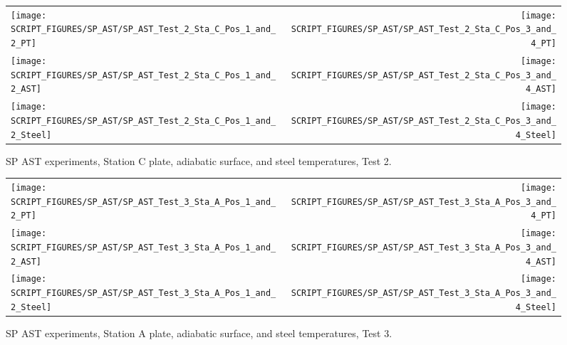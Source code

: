 \begin{figure}[p]
\begin{tabular*}{\textwidth}{l@{\extracolsep{\fill}}r}
\texttt{[image: SCRIPT\_FIGURES/SP\_AST/SP\_AST\_Test\_2\_Sta\_C\_Pos\_1\_and\_2\_PT]} &
\texttt{[image: SCRIPT\_FIGURES/SP\_AST/SP\_AST\_Test\_2\_Sta\_C\_Pos\_3\_and\_4\_PT]} \\
\texttt{[image: SCRIPT\_FIGURES/SP\_AST/SP\_AST\_Test\_2\_Sta\_C\_Pos\_1\_and\_2\_AST]} &
\texttt{[image: SCRIPT\_FIGURES/SP\_AST/SP\_AST\_Test\_2\_Sta\_C\_Pos\_3\_and\_4\_AST]} \\
\texttt{[image: SCRIPT\_FIGURES/SP\_AST/SP\_AST\_Test\_2\_Sta\_C\_Pos\_1\_and\_2\_Steel]} &
\texttt{[image: SCRIPT\_FIGURES/SP\_AST/SP\_AST\_Test\_2\_Sta\_C\_Pos\_3\_and\_4\_Steel]}
\end{tabular*}
\caption[SP AST experiments, Station C plate, adiabatic surface, and steel temperatures, Test 2]{SP AST experiments, Station C plate, adiabatic surface, and steel temperatures, Test 2.}
\label{SP_Test_2_Station_C}
\end{figure}


\begin{figure}[p]
\begin{tabular*}{\textwidth}{l@{\extracolsep{\fill}}r}
\texttt{[image: SCRIPT\_FIGURES/SP\_AST/SP\_AST\_Test\_3\_Sta\_A\_Pos\_1\_and\_2\_PT]} &
\texttt{[image: SCRIPT\_FIGURES/SP\_AST/SP\_AST\_Test\_3\_Sta\_A\_Pos\_3\_and\_4\_PT]} \\
\texttt{[image: SCRIPT\_FIGURES/SP\_AST/SP\_AST\_Test\_3\_Sta\_A\_Pos\_1\_and\_2\_AST]} &
\texttt{[image: SCRIPT\_FIGURES/SP\_AST/SP\_AST\_Test\_3\_Sta\_A\_Pos\_3\_and\_4\_AST]} \\
\texttt{[image: SCRIPT\_FIGURES/SP\_AST/SP\_AST\_Test\_3\_Sta\_A\_Pos\_1\_and\_2\_Steel]} &
\texttt{[image: SCRIPT\_FIGURES/SP\_AST/SP\_AST\_Test\_3\_Sta\_A\_Pos\_3\_and\_4\_Steel]}
\end{tabular*}
\caption[SP AST experiments, Station A plate, adiabatic surface, and steel temperatures, Test 3]{SP AST experiments, Station A plate, adiabatic surface, and steel temperatures, Test 3.}
\label{SP_Test_3_Station_A}
\end{figure}

